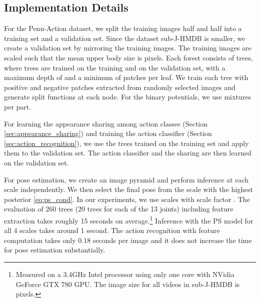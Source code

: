 \documentclass[a4paper, 10pt, conference]{ieeeconf}      \usepackage{FG2017}
\begin{document}
\subsection{Implementation Details}

For the Penn-Action dataset, we split the training images half and half into a training set and a validation set. Since the dataset sub-J-HMDB is smaller, we create a validation set by mirroring the training images. The training images are scaled such that the mean upper body size is  pixels. Each forest consists of  trees, where  trees are trained on the training and  on the validation set, with a maximum depth of  and a minimum of  patches per leaf. We train each tree with  positive and  negative patches extracted from  randomly selected images and generate  split functions at each node. 
For the binary potentials, we use  mixtures per part. 

For learning the appearance sharing among action classes (Section \ref{sec:appearance_sharing}) and training the action classifier (Section \ref{sec:action_recognition}), we use the  trees trained on the training set and apply them to the validation set. The action classifier and the sharing are then learned on the validation set.  

For pose estimation, we create an image pyramid and perform inference at each scale independently. We then select the final pose from the scale with the highest posterior \eqref{eq:ps_cond}. In our experiments, we use  scales with scale factor . 
The evaluation of 260 trees (20 trees for each of the 13 joints) including feature extraction takes roughly 15 seconds on average.\footnote{Measured on a 3.4GHz Intel processor using only one core with NVidia GeForce GTX 780 GPU. The image size for all videos in sub-J-HMDB is  pixels.} Inference with the PS model for all 4 scales takes around 1 second. The action recognition with feature computation takes only 0.18 seconds per image and it does not increase the time for pose estimation substantially. 
\end{document}
